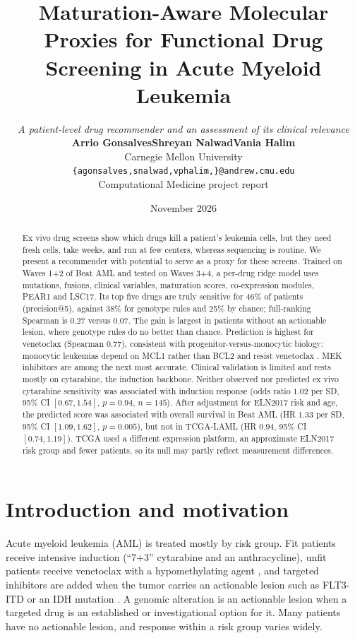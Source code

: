 \documentclass[11pt,logo,nonumbering]{preprint}
\title{Maturation-Aware Molecular Proxies for Functional Drug Screening in Acute Myeloid Leukemia}
\author{
  \textit{A patient-level drug recommender and an assessment of its clinical relevance}\\[0.8em]
  \textbf{Arrio Gonsalves}\quad\textbf{Shreyan Nalwad}\quad\textbf{Vania Halim}\\
  Carnegie Mellon University\\
  \texttt{\{agonsalves,snalwad,vphalim,\}@andrew.cmu.edu}\\[0.5em]
  {\small Computational Medicine project report}
}
\date{November 2026}
\begin{document}
\maketitle
\begin{abstract}
Ex vivo drug screens show which drugs kill a patient's leukemia cells, but they need fresh cells, take weeks, and run at few centers, whereas sequencing is routine. We present a recommender with potential to serve as a proxy for these screens. Trained on Waves 1+2 of Beat AML \citep{bottomly2022,beataml2} and tested on Waves 3+4, a per-drug ridge model uses mutations, fusions, clinical variables, maturation scores, co-expression modules, PEAR1 and LSC17. Its top five drugs are truly sensitive for 46\% of patients (precision@5), against 38\% for genotype rules and 25\% by chance; full-ranking Spearman is 0.27 versus 0.07. The gain is largest in patients without an actionable lesion, where genotype rules do no better than chance. Prediction is highest for venetoclax (Spearman 0.77), consistent with progenitor-versus-monocytic biology: monocytic leukemias depend on MCL1 rather than BCL2 and resist venetoclax \citep{bottomly2022,pei2020}. MEK inhibitors are among the next most accurate. Clinical validation is limited and rests mostly on cytarabine, the induction backbone. Neither observed nor predicted ex vivo cytarabine sensitivity was associated with induction response (odds ratio $1.02$ per SD, 95\% CI $[0.67, 1.54]$, $p=0.94$, $n=145$). After adjustment for ELN2017 risk and age, the predicted score was associated with overall survival in Beat AML (HR $1.33$ per SD, 95\% CI $[1.09, 1.62]$, $p=0.005$), but not in TCGA-LAML (HR $0.94$, 95\% CI $[0.74, 1.19]$). TCGA used a different expression platform, an approximate ELN2017 risk group and fewer patients, so its null may partly reflect measurement differences.
\end{abstract}

\section{Introduction and motivation}
Acute myeloid leukemia (AML) is treated mostly by risk group. Fit patients receive intensive induction (``7+3'' cytarabine and an anthracycline), unfit patients receive venetoclax with a hypomethylating agent \citep{dinardo2020viale}, and targeted inhibitors are added when the tumor carries an actionable lesion such as FLT3-ITD or an IDH mutation \citep{dohner2017eln}. A genomic alteration is an actionable lesion when a targeted drug is an established or investigational option for it. Many patients have no actionable lesion, and response within a risk group varies widely.
\end{document}
